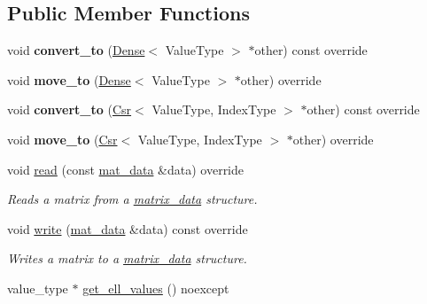 \subsection*{Public Member Functions}
\begin{DoxyCompactItemize}
\item 
\mbox{\label{classgko_1_1matrix_1_1Hybrid_a84640a1655c79facb5b7776bed7b31f2}} 
void {\bfseries convert\+\_\+to} (\hyperlink{classgko_1_1matrix_1_1Dense}{Dense}$<$ Value\+Type $>$ $\ast$other) const override
\item 
\mbox{\label{classgko_1_1matrix_1_1Hybrid_a3e09a24869354c749e5e992611964e85}} 
void {\bfseries move\+\_\+to} (\hyperlink{classgko_1_1matrix_1_1Dense}{Dense}$<$ Value\+Type $>$ $\ast$other) override
\item 
\mbox{\label{classgko_1_1matrix_1_1Hybrid_ac5e0ac17eb2daae3883ee1c93bb7d9ca}} 
void {\bfseries convert\+\_\+to} (\hyperlink{classgko_1_1matrix_1_1Csr}{Csr}$<$ Value\+Type, Index\+Type $>$ $\ast$other) const override
\item 
\mbox{\label{classgko_1_1matrix_1_1Hybrid_af8ef6b6956c90665d51f40c68d3a8221}} 
void {\bfseries move\+\_\+to} (\hyperlink{classgko_1_1matrix_1_1Csr}{Csr}$<$ Value\+Type, Index\+Type $>$ $\ast$other) override
\item 
void \hyperlink{classgko_1_1matrix_1_1Hybrid_a7eff2922ae21e9722b343ca1832d8bf5}{read} (const \hyperlink{structgko_1_1matrix__data}{mat\+\_\+data} \&data) override
\begin{DoxyCompactList}\small\item\em Reads a matrix from a \hyperlink{structgko_1_1matrix__data}{matrix\+\_\+data} structure. \end{DoxyCompactList}\item 
void \hyperlink{classgko_1_1matrix_1_1Hybrid_a626c07541641bcdfd9a7f61322a89cbe}{write} (\hyperlink{structgko_1_1matrix__data}{mat\+\_\+data} \&data) const override
\begin{DoxyCompactList}\small\item\em Writes a matrix to a \hyperlink{structgko_1_1matrix__data}{matrix\+\_\+data} structure. \end{DoxyCompactList}\item 
value\+\_\+type $\ast$ \hyperlink{classgko_1_1matrix_1_1Hybrid_a9cd9c8b8dbf8b3c2c014f355faa61474}{get\+\_\+ell\+\_\+values} () noexcept

\end{DoxyCompactItemize}
